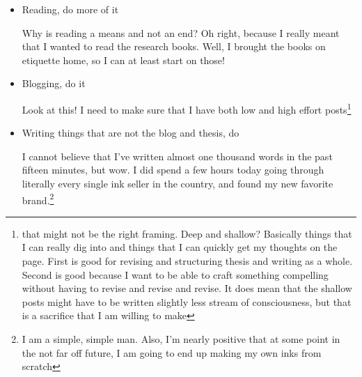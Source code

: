 \documentclass[12pt]{article}
\renewcommand{\,}{\textsuperscript{,}}
\begin{document}
\begin{itemize}
\begin{itemize}
\begin{itemize}
\item Reading, do more of it

Why is reading a means and not an end?  
Oh right, because I really meant that I wanted to read the research books.  
Well, I brought the books on etiquette home, so I can at least start on those!

\item Blogging, do it

Look at this! I need to make sure that I have both low and high effort posts\footnote{that might not be the right framing. Deep and shallow? Basically things that I can really dig into and things that I can quickly get my thoughts on the page.  
First is good for revising and structuring thesis and writing as a whole.  
Second is good because I want to be able to craft something compelling without having to revise and revise and revise.  
It does mean that the shallow posts might have to be written slightly less stream of consciousness, but that is a sacrifice that I am willing to make}

\item Writing things that are not the blog and thesis, do

I cannot believe that I've written almost one thousand words in the past fifteen minutes, but wow.  
I did spend a few hours today going through literally every single ink seller in the country, and found my new favorite brand.\footnote{I am a simple, simple man. Also, I'm nearly positive that at some point in the not far off future, I am going to end up making my own inks from scratch}

\end{itemize}

\end{itemize}

\end{itemize}
\end{document}
